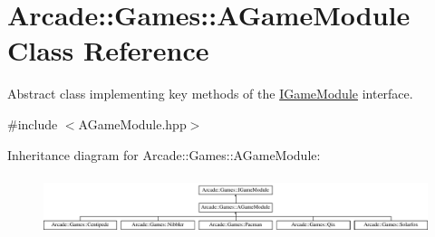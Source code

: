 \hypertarget{classArcade_1_1Games_1_1AGameModule}{}\section{Arcade\+::Games\+::A\+Game\+Module Class Reference}
\label{classArcade_1_1Games_1_1AGameModule}


Abstract class implementing key methods of the \mbox{\hyperlink{classArcade_1_1Games_1_1IGameModule}{I\+Game\+Module}} interface.  




{\ttfamily \#include $<$A\+Game\+Module.\+hpp$>$}

Inheritance diagram for Arcade\+::Games\+::A\+Game\+Module\+:\begin{figure}[H]
\begin{center}
\leavevmode
\includegraphics[height=1.723077cm]{classArcade_1_1Games_1_1AGameModule}
\end{center}
\end{figure}
